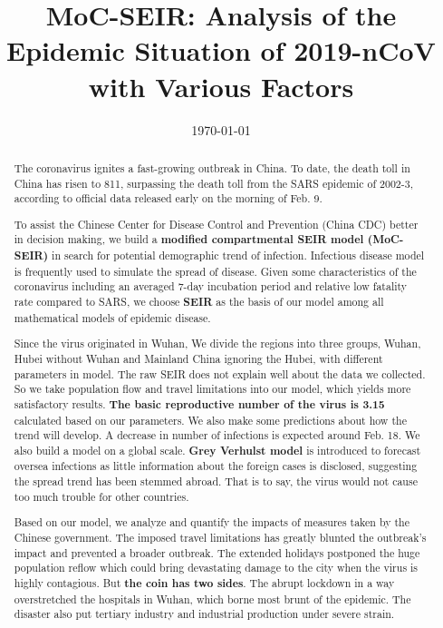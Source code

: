 \documentclass[12pt]{mcmthesis}
\begin{document}
\linespread{0.6} %
\setlength{\parskip}{0.5\baselineskip} %
\title{MoC-SEIR: Analysis of the Epidemic Situation of 2019-nCoV with Various Factors}

\date{\today}
	\begin{abstract}
	
The coronavirus ignites a fast-growing outbreak in China. To date, the death toll in China has risen to 811, surpassing the death toll from the SARS epidemic of 2002-3, according to official data released early on the morning of Feb. 9.

To assist the Chinese Center for Disease Control and Prevention (China CDC) better in decision making, we build a \textbf{modified compartmental SEIR model (MoC-SEIR)} in search for potential demographic trend of infection. Infectious disease model is frequently used to simulate the spread of disease. Given some characteristics of the coronavirus including an averaged 7-day incubation period and relative low fatality rate compared to SARS, we choose \textbf{SEIR} as the basis of our model among all mathematical models of epidemic disease.

Since the virus originated in Wuhan, We divide the regions into three groups, Wuhan, Hubei without Wuhan and Mainland China ignoring the Hubei, with different parameters in model. The raw SEIR does not explain well about the data we collected. So we take population flow and travel limitations into our model, which yields more satisfactory results. \textbf{The basic reproductive number of the virus is 3.15} calculated based on our parameters. We also make some predictions about how the trend will develop. A decrease in number of infections is expected around Feb. 18. We also build a model on a global scale. \textbf{Grey Verhulst model} is introduced to forecast oversea infections as little information about the foreign cases is disclosed, suggesting the spread trend has been stemmed abroad. That is to say, the virus would not cause too much trouble for other countries.

Based on our model, we analyze and quantify the impacts of measures taken by the Chinese government. The imposed travel limitations has greatly blunted the outbreak's impact and prevented a broader outbreak. The extended holidays postponed the huge population reflow which could bring devastating damage to the city when the virus is highly contagious. But \textbf{the coin has two sides}. The abrupt lockdown in a way overstretched the hospitals in Wuhan, which borne most brunt of the epidemic. The disaster also put tertiary industry and industrial production under severe strain.


\end{abstract}
\end{document}
